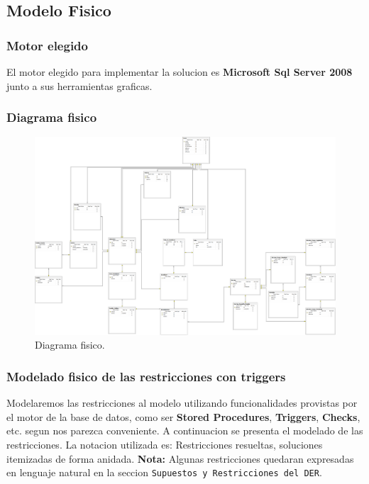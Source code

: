 \subsection{Modelo Fisico}
\subsubsection{Motor elegido}
El motor elegido para implementar la solucion es \textbf{Microsoft Sql Server 2008} junto a sus herramientas graficas.

\subsubsection{Diagrama fisico}
\begin{landscape}
	\begin{figure}[t]
	  \centering
		\includegraphics[scale=0.35]{fig/modelo-fisico.png}
	  \caption{Diagrama fisico.}
	\end{figure}
\end{landscape}

\subsubsection{Modelado fisico de las restricciones con triggers}
Modelaremos las restricciones al modelo utilizando funcionalidades provistas por el motor de la base de datos, como ser \textbf{Stored Procedures}, \textbf{Triggers}, \textbf{Checks}, etc. segun nos parezca conveniente. A continuacion se presenta el modelado de las restricciones. La notacion utilizada es: Restricciones resueltas, soluciones itemizadas de forma anidada. \textbf{Nota:} Algunas restricciones quedaran expresadas en lenguaje natural en la seccion \texttt{Supuestos y Restricciones del DER}.

